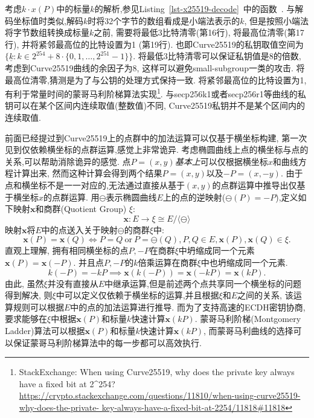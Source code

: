 考虑$k\cdot x(P)$中的标量$k$的解析,参见Listing~\ref{lst-x25519-decode}~中的函数~.
与解码坐标值时类似,解码$k$时将32个字节的数组看成是小端法表示的$k$,
但是按照小端法将字节数组转换成标量$k$之前,
需要将最低3比特清零(第16行), 将最高位清零(第17行), 并将紧邻最高位的比特设置为1 (第19行).
也即Curve25519的私钥取值空间为$\{\underline{k}: k\in 2^{254} + 8\cdot\{0,1,\ldots,2^{251}-1\}\}$.
将最低3比特清零可以保证私钥值是8的倍数,考虑到Curve25519曲线的余因子为8,
这样可以避免small-subgroup一类的攻击.
将最高位清零,猜测是为了与公钥的处理方式保持一致.
将紧邻最高位的比特设置为1,有利于常量时间的蒙哥马利阶梯算法实现\footnote{
StackExchange: When using Curve25519, why does the private key always have a fixed bit at 2\^{}254?
\url{https://crypto.stackexchange.com/questions/11810/when-using-curve25519-why-does-the-private-
key-always-have-a-fixed-bit-at-2254/11818\#11818}}.
与secp256k1或者secp256r1等曲线的私钥可以在某个区间内连续取值(整数值)不同,
Curve25519私钥并不是某个区间内的连续取值.

前面已经提过到Curve25519上的点群中的加法运算可以仅基于横坐标构建,
第一次见到仅依赖横坐标的点群运算,感觉上非常诡异.
考虑椭圆曲线上点的横坐标与点的关系,可以帮助消除诡异的感觉.
点$P=(x,y)$\textit{基本上}可以仅根据横坐标$x$和曲线方程计算出来,
然而这种计算会得到两个结果$P=(x,y)$以及$-P = (x, -y)$.
由于点和横坐标不是一一对应的,无法通过直接从基于$(x,y)$的点群运算中推导出仅基于横坐标$x$的点群运算.
用$\ominus$表示椭圆曲线$E$上的点的逆映射($\ominus(P) = -P$),定义如下映射$\mathbf{x}$和商群(Quotient Group) $\xi$:
$$\mathbf{x}: E \rightarrow\xi \cong E/\langle\ominus\rangle$$
映射$\mathbf{x}$将$E$中的点送入关于映射$\ominus$的商群$\xi$中:
$$\mathbf{x}(P) = \mathbf{x}(Q) \iff P = Q\ \text{or}\ P = \ominus(Q), P, Q \in E, \mathbf{x}(P), \mathbf{x}(Q) \in \xi.$$
直观上理解, 拥有相同横坐标的点$P, -P$在商群$\xi$中坍缩成同一个元素$\mathbf{x}(P)=\mathbf{x}(-P)$.
并且点$P, -P$的$k$倍乘运算在商群$\xi$中也坍缩成同一个元素.
$$k(-P) = -kP \implies \mathbf{x}(k(-P)) = \mathbf{x}(-kP)= \mathbf{x}(kP).$$
由此, 虽然$\xi$并没有直接从$E$中继承运算,但是前述两个点共享同一个横坐标的问题得到解决,
则$\xi$中可以定义仅依赖于横坐标的运算,并且根据$\xi$和$E$之间的关系,
该运算规则可以根据$E$中的点的加法运算进行推导.
而为了支持高速的ECDH密钥协商,要求能够在$\xi$中根据$\mathbf{x}(P)$和标量$k$快速计算$\mathbf{x}(kP)$.
蒙哥马利阶梯(Montgomery Ladder)算法可以根据$\mathbf{x}(P)$和标量$k$快速计算$\mathbf{x}(kP)$,
而蒙哥马利曲线的选择可以保证蒙哥马利阶梯算法中的每一步都可以高效执行.



